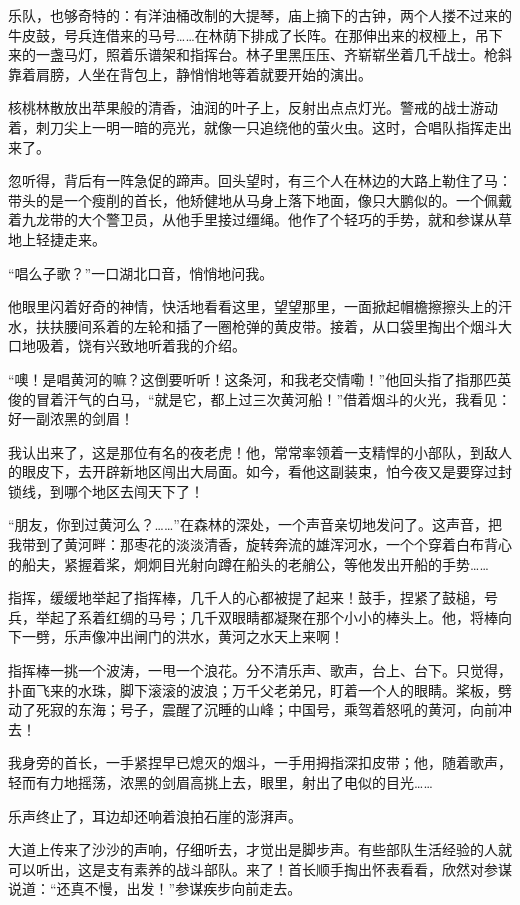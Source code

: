 \documentclass[12pt,UTF-8,openany]{ctexbook}
\begin{document}
\begin{normalsize}
    乐队，也够奇特的：有洋油桶改制的大提琴，庙上摘下的古钟，两个人搂不过来的牛皮鼓，号兵连借来的马号……在林荫下排成了长阵。在那伸出来的杈桠上，吊下来的一盏马灯，照着乐谱架和指挥台。林子里黑压压、齐崭崭坐着几千战士。枪斜靠着肩膀，人坐在背包上，静悄悄地等着就要开始的演出。
    
    核桃林散放出苹果般的清香，油润的叶子上，反射出点点灯光。警戒的战士游动着，刺刀尖上一明一暗的亮光，就像一只追绕他的萤火虫。这时，合唱队指挥走出来了。
    
    忽听得，背后有一阵急促的蹄声。回头望时，有三个人在林边的大路上勒住了马：带头的是一个瘦削的首长，他矫健地从马身上落下地面，像只大鹏似的。一个佩戴着九龙带的大个警卫员，从他手里接过缰绳。他作了个轻巧的手势，就和参谋从草地上轻捷走来。
    
    “唱么子歌？”一口湖北口音，悄悄地问我。
    
    他眼里闪着好奇的神情，快活地看看这里，望望那里，一面掀起帽檐擦擦头上的汗水，扶扶腰间系着的左轮和插了一圈枪弹的黄皮带。接着，从口袋里掏出个烟斗大口地吸着，饶有兴致地听着我的介绍。
    
    “噢！是唱黄河的嘛？这倒要听听！这条河，和我老交情嘞！”他回头指了指那匹英俊的冒着汗气的白马，“就是它，都上过三次黄河船！”借着烟斗的火光，我看见：好一副浓黑的剑眉！
    
    我认出来了，这是那位有名的夜老虎！他，常常率领着一支精悍的小部队，到敌人的眼皮下，去开辟新地区闯出大局面。如今，看他这副装束，怕今夜又是要穿过封锁线，到哪个地区去闯天下了！
    
    “朋友，你到过黄河么？……”在森林的深处，一个声音亲切地发问了。这声音，把我带到了黄河畔：那枣花的淡淡清香，旋转奔流的雄浑河水，一个个穿着白布背心的船夫，紧握着桨，炯炯目光射向蹲在船头的老艄公，等他发出开船的手势……
    
    指挥，缓缓地举起了指挥棒，几千人的心都被提了起来！鼓手，捏紧了鼓槌，号兵，举起了系着红绸的马号；几千双眼睛都凝聚在那个小小的棒头上。他，将棒向下一劈，乐声像冲出闸门的洪水，黄河之水天上来啊！
    
    指挥棒一挑一个波涛，一甩一个浪花。分不清乐声、歌声，台上、台下。只觉得，扑面飞来的水珠，脚下滚滚的波浪；万千父老弟兄，盯着一个人的眼睛。桨板，劈动了死寂的东海；号子，震醒了沉睡的山峰；中国号，乘驾着怒吼的黄河，向前冲去！
    
    我身旁的首长，一手紧捏早已熄灭的烟斗，一手用拇指深扣皮带；他，随着歌声，轻而有力地摇荡，浓黑的剑眉高挑上去，眼里，射出了电似的目光……
    
    乐声终止了，耳边却还响着浪拍石崖的澎湃声。
    
    大道上传来了沙沙的声响，仔细听去，才觉出是脚步声。有些部队生活经验的人就可以听出，这是支有素养的战斗部队。来了！首长顺手掏出怀表看看，欣然对参谋说道：“还真不慢，出发！”参谋疾步向前走去。
    

\end{normalsize}
\end{document}
